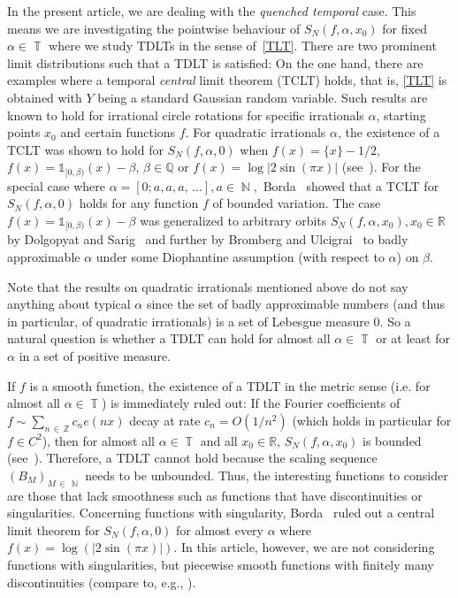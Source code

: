 \documentclass[AHL,Unicode,longabstracts,published]{cedram}
\DeclareMathOperator{\N}{\mathbb{N}}
\DeclareMathOperator{\T}{\mathbb{T}}
\newcommand{\bbR}{\mathbb{R}}
\newcommand{\bbQ}{\mathbb{Q}}
\newcommand{\bbZ}{\mathbb{Z}}
\newcommand{\bbR}{\mathbb{R}}
\begin{document}
In the present article, we are dealing with the \emph{quenched temporal} case. This means we are investigating the pointwise behaviour of $S_N(f,\alpha,x_0)$ for fixed $\alpha \in \T$ where we study TDLTs in the sense of~\eqref{TLT}. There are two prominent limit distributions such that a TDLT is satisfied: On the one hand, there are examples where a temporal \emph{central} limit theorem (TCLT) holds, that is, \eqref{TLT} is obtained with $Y$ being a standard Gaussian random variable. Such results are known to hold for irrational circle rotations for specific irrationals $\alpha$, starting points $x_0 $ and certain functions $f$. For quadratic irrationals $\alpha$, the existence of a TCLT was shown to hold for $S_N(f,\alpha,0)$ when $f(x) = \{x\} - 1/2$, $f(x) = \mathds{1}_{[0,\beta)}(x) - \beta$, $\beta \in \bbQ$ or $f(x) = \log| 2 \sin (\pi x)|$ (see~\cite{beck2,beck3,beck1,borda}). For the special case where $\alpha = [0;a,a,a,\,\ldots], a \in \N,$ Borda~\cite{borda} showed that a TCLT for $S_N(f,\alpha,0)$ holds for any function $f$ of bounded variation. The case $f(x) = \mathds{1}_{[0,\beta)}(x) - \beta$ was generalized to arbitrary orbits $S_N(f,\alpha,x_0), x_0 \in \bbR$ by Dolgopyat and Sarig~\cite{dol_sar} and further by Bromberg and Ulcigrai~\cite{brom_ulc} to badly approximable $\alpha$ under some Diophantine assumption (with respect to $\alpha$) on $\beta$.


Note that the results on quadratic irrationals mentioned above do not say anything about typical $\alpha$ since the set of badly approximable numbers (and thus in particular, of quadratic irrationals) is a set of Lebesgue measure $0$. So a natural question is whether a TDLT can hold for almost all $\alpha \in \T$ or at least for $\alpha $ in a set of positive measure.

If $f$ is a smooth function, the existence of a TDLT in the metric sense (i.e. for almost all $\alpha \in \T$) is immediately ruled out: If the Fourier coefficients of $f \sim \sum_{n\,\in\,\bbZ} c_n e(nx)$ decay at rate $c_n = O(1/n^2)$ (which holds in particular for $f \in C^2$), then for almost all $\alpha \in \T$ and all $x_0 \in \bbR$, $S_N(f,\alpha,x_0)$ is bounded (see~\cite{quenched,herman}). Therefore, a TDLT cannot hold because the scaling sequence $(B_M)_{M\,\in\,\N}$ needs to be unbounded. Thus, the interesting functions to consider are those that lack smoothness such as functions that have discontinuities or singularities. Concerning functions with singularity, Borda~\cite{borda} ruled out a central limit theorem for $S_N(f,\alpha,0)$ for almost every $\alpha$ where $f(x) =\log (| 2 \sin(\pi x) |)$. In this article, however, we are not considering functions with singularities, but piecewise smooth functions with finitely many discontinuities (compare to, e.g., \cite{dol_sar_no,quenched,upper_dens}).
\end{document}
